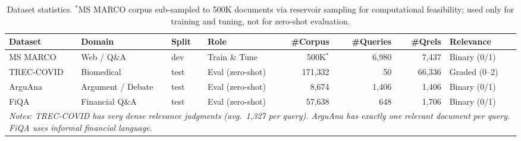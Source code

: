 \begin{table}[ht]
\centering
\small
\caption{Dataset statistics. $^*$MS MARCO corpus sub-sampled to 500K documents via reservoir sampling for computational feasibility; used only for training and tuning, not for zero-shot evaluation.}
\label{tab:datasets}
\begin{tabular}{llllrrrl}
\toprule
Dataset & Domain & Split & Role & \#Corpus & \#Queries & \#Qrels & Relevance \\
\midrule
MS MARCO & Web / Q\&A & dev & Train \& Tune & 500K$^*$ & 6,980 & 7,437 & Binary (0/1) \\
TREC-COVID & Biomedical & test & Eval (zero-shot) & 171,332 & 50 & 66,336 & Graded (0--2) \\
ArguAna & Argument / Debate & test & Eval (zero-shot) & 8,674 & 1,406 & 1,406 & Binary (0/1) \\
FiQA & Financial Q\&A & test & Eval (zero-shot) & 57,638 & 648 & 1,706 & Binary (0/1) \\
\midrule
\multicolumn{8}{l}{\textit{Notes: TREC-COVID has very dense relevance judgments (avg.\ 1,327 per query). ArguAna has exactly one relevant document per query. FiQA uses informal financial language.}} \\
\bottomrule
\end{tabular}
\end{table}
